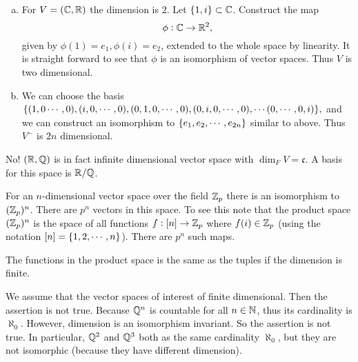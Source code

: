 \begin{problem}
	\begin{solution}
		\begin{enumerate}[(a)]
			\item For $ V = (\mathbb{C},\mathbb{R}) $ the dimension is $ 2 $. Let $ \{1,i\} \subset \mathbb{C} $. Construct the map
			\[ \phi: \mathbb{C} \to \mathbb{R}^2, \]
			given by $ \phi(1) = e_1, \phi(i) = e_2 $, extended to the whole space by linearity. It is straight forward to see that $ \phi $ is an isomorphism of vector spaces. Thus $ V $ is two dimensional.
			
			\item We can choose the basis $ \{(1,0\cdots,0),(i,0,\cdots,0),(0,1,0,\cdots,0),(0,i,0,\cdots,0),\cdots (0,\cdots,0,i)\}, $ and we can construct an isomorphism to $ \{e_1,e_2,\cdots,e_{2n}\} $ similar to above. Thus $ V^- $ is $ 2n $ dimensional.
		\end{enumerate}
	\end{solution}
\end{problem}

\begin{problem}
	\begin{solution}
		No! $ (\mathbb{R},\mathbb{Q}) $ is in fact infinite dimensional vector space with $ \dim_FV = \mathfrak{c} $. A basis for this space is $ \mathbb{R}/\mathbb{Q} $.
	\end{solution}
\end{problem}

\begin{problem}
	\begin{solution}
		For an $ n $-dimensional vector space over the field $ \mathbb{Z}_p $ there is an isomorphism to $ (\mathbb{Z}_p)^n $. There are $ p^n $ vectors in this space. To see this note that the product space $ (\mathbb{Z}_p)^n $ is the space of all functions $ f:[n]\to\mathbb{Z}_p $ where $ f(i) \in \mathbb{Z}_p $ (using the notation $ [n] = \{1,2,\cdots,n\} $). There are $ p^n $ such maps. 
		\begin{remark}
			The functions in the product space is the same as the tuples if the dimension is finite.
		\end{remark}
	\end{solution}
\end{problem}


\begin{problem}
	\begin{solution}
		We assume that the vector spaces of interest of finite dimensional. Then the assertion is not true. Because $ \mathbb{Q}^n $ is countable for all $ n\in \mathbb{N} $, thus its cardinality is $ \aleph_0 $. However, dimension is an isomorphism invariant. So the assertion is not true. In particular, $ \mathbb{Q}^2 $ and $ \mathbb{Q}^3 $ both as the same cardinality $ \aleph_0 $, but they are not isomorphic (because they have different dimension).
	\end{solution}
\end{problem}


